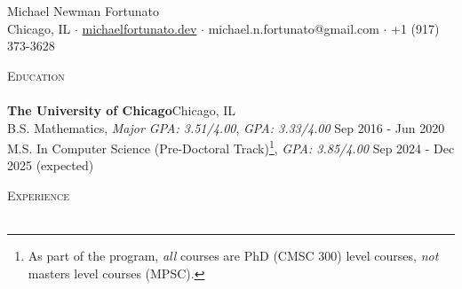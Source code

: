 \documentclass[a4paper]{article}
\newcommand{\lineunder} {
    \vspace*{-8pt} \\
    \hspace*{-18pt} \hrulefill \\
}
\newcommand{\header} [1] {
    {\hspace*{-18pt}\vspace*{6pt} \textsc{#1}}
    \vspace*{-6pt} \lineunder
}
\begin{document}
\vspace*{-40pt}



\vspace*{-10pt}
\begin{center}
	{\Huge {Michael Newman Fortunato}}\\
	Chicago, IL $\cdot$ \href{https://www.michaelfortunato.dev}{michaelfortunato.dev} $\cdot$  michael.n.fortunato@gmail.com $\cdot$ +1 (917) 373-3628 \end{center}

\header{Education}
\textbf{The University of Chicago}\hfill Chicago, IL\\
B.S. Mathematics, \textit{Major GPA: 3.51/4.00}, \textit{GPA: 3.33/4.00} \hfill Sep 2016 - Jun 2020\\
M.S. In Computer Science (Pre-Doctoral Track)\footnote{As part of the program, \textit{all} courses are PhD (CMSC 300) level courses, \textit{not} masters level courses (MPSC).}, \textit{GPA: 3.85/4.00} \hfill Sep 2024 - Dec 2025 (expected)\\
\vspace{2mm}

\header{Experience}
\vspace{1mm}
\end{document}
